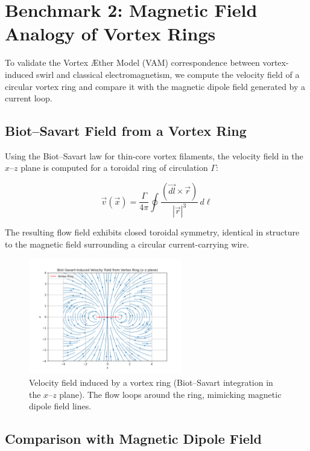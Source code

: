 \section{Benchmark 2: Magnetic Field Analogy of Vortex Rings}

To validate the Vortex Æther Model (VAM) correspondence between vortex-induced swirl and classical electromagnetism, we compute the velocity field of a circular vortex ring and compare it with the magnetic dipole field generated by a current loop.

\subsection{Biot–Savart Field from a Vortex Ring}

Using the Biot–Savart law for thin-core vortex filaments, the velocity field in the $x$–$z$ plane is computed for a toroidal ring of circulation $\Gamma$:

\begin{equation}
\vec{v}(\vec{x}) = \frac{\Gamma}{4\pi} \oint \frac{(\vec{dl} \times \vec{r})}{|\vec{r}|^3} \, d\ell
\end{equation}

\noindent
The resulting flow field exhibits closed toroidal symmetry, identical in structure to the magnetic field surrounding a circular current-carrying wire.

\begin{figure}[H]
    \centering
    \includegraphics[width=0.6\textwidth]{images/dipole_1}
    \caption{Velocity field induced by a vortex ring (Biot–Savart integration in the $x$–$z$ plane). The flow loops around the ring, mimicking magnetic dipole field lines.}
\end{figure}

\subsection{Comparison with Magnetic Dipole Field}

